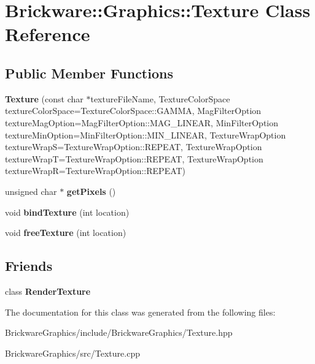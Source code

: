 \hypertarget{classBrickware_1_1Graphics_1_1Texture}{}\section{Brickware\+:\+:Graphics\+:\+:Texture Class Reference}
\label{classBrickware_1_1Graphics_1_1Texture}
\subsection*{Public Member Functions}
\begin{DoxyCompactItemize}
\item 
\hypertarget{classBrickware_1_1Graphics_1_1Texture_a76d137ff78b600e3058d6fa3fcb9e103}{}{\bfseries Texture} (const char $\ast$texture\+File\+Name, Texture\+Color\+Space texture\+Color\+Space=Texture\+Color\+Space\+::\+G\+A\+M\+M\+A, Mag\+Filter\+Option texture\+Mag\+Option=Mag\+Filter\+Option\+::\+M\+A\+G\+\_\+\+L\+I\+N\+E\+A\+R, Min\+Filter\+Option texture\+Min\+Option=Min\+Filter\+Option\+::\+M\+I\+N\+\_\+\+L\+I\+N\+E\+A\+R, Texture\+Wrap\+Option texture\+Wrap\+S=Texture\+Wrap\+Option\+::\+R\+E\+P\+E\+A\+T, Texture\+Wrap\+Option texture\+Wrap\+T=Texture\+Wrap\+Option\+::\+R\+E\+P\+E\+A\+T, Texture\+Wrap\+Option texture\+Wrap\+R=Texture\+Wrap\+Option\+::\+R\+E\+P\+E\+A\+T)\label{classBrickware_1_1Graphics_1_1Texture_a76d137ff78b600e3058d6fa3fcb9e103}

\item 
\hypertarget{classBrickware_1_1Graphics_1_1Texture_a28d973856e601b32a707737b932abab9}{}unsigned char $\ast$ {\bfseries get\+Pixels} ()\label{classBrickware_1_1Graphics_1_1Texture_a28d973856e601b32a707737b932abab9}

\item 
\hypertarget{classBrickware_1_1Graphics_1_1Texture_a81a440531d305d2f12b306afd4bd1bc8}{}void {\bfseries bind\+Texture} (int location)\label{classBrickware_1_1Graphics_1_1Texture_a81a440531d305d2f12b306afd4bd1bc8}

\item 
\hypertarget{classBrickware_1_1Graphics_1_1Texture_a45867768ca259dd1a6318e0cece5c2d7}{}void {\bfseries free\+Texture} (int location)\label{classBrickware_1_1Graphics_1_1Texture_a45867768ca259dd1a6318e0cece5c2d7}

\end{DoxyCompactItemize}
\subsection*{Friends}
\begin{DoxyCompactItemize}
\item 
\hypertarget{classBrickware_1_1Graphics_1_1Texture_a2548fc9744f5e43e0276d5627ca178de}{}class {\bfseries Render\+Texture}\label{classBrickware_1_1Graphics_1_1Texture_a2548fc9744f5e43e0276d5627ca178de}

\end{DoxyCompactItemize}


The documentation for this class was generated from the following files\+:\begin{DoxyCompactItemize}
\item 
Brickware\+Graphics/include/\+Brickware\+Graphics/Texture.\+hpp\item 
Brickware\+Graphics/src/Texture.\+cpp\end{DoxyCompactItemize}
